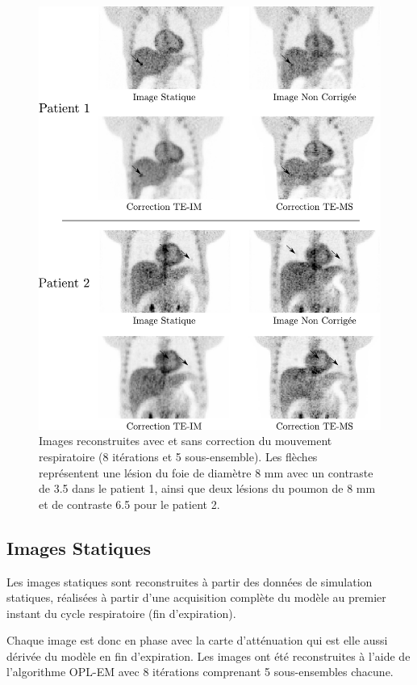 \begin{figure}
 \centering
 \includegraphics[width=15cm]{images/exempleImageReconToutes}
 \caption[Exemples d'mages reconstruites corrigées et non corrigées du mouvement]{Images reconstruites avec et sans correction du mouvement respiratoire (8 itérations et 5 sous-ensemble). Les flèches représentent une lésion du foie de diamètre 8 mm avec un contraste de 3.5 dans le patient 1, ainsi que deux lésions du poumon de 8 mm et de contraste 6.5 pour le patient 2.}
 \label{fig:exempleImageReconTous}
\end{figure}


\subsection{Images Statiques}

Les images statiques sont reconstruites à partir des données de simulation statiques, réalisées à partir d'une acquisition complète du modèle au premier instant du cycle respiratoire (fin d'expiration).

Chaque image est donc en phase avec la carte d'atténuation qui est elle aussi dérivée du modèle en fin d'expiration. Les images ont été reconstruites à l'aide de l'algorithme OPL-EM avec 8 itérations comprenant 5 sous-ensembles chacune.

